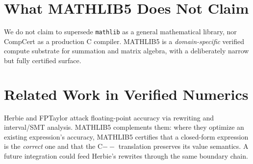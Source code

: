 \section{What MATHLIB5 Does Not Claim}
\label{sec:compare-not}

We do not claim to supersede \texttt{mathlib} as a general mathematical
library, nor CompCert as a production C compiler. MATHLIB5 is a
\emph{domain-specific} verified compute substrate for summation and
matrix algebra, with a deliberately narrow but fully certified surface.

\section{Related Work in Verified Numerics}
\label{sec:compare-num}

Herbie and FPTaylor attack floating-point accuracy via rewriting and
interval/SMT analysis. MATHLIB5 complements them: where they optimize an
existing expression's accuracy, MATHLIB5 certifies that a closed-form
expression is the \emph{correct} one and that the C$--$ translation
preserves its value semantics. A future integration could feed Herbie's
rewrites through the same boundary chain.
